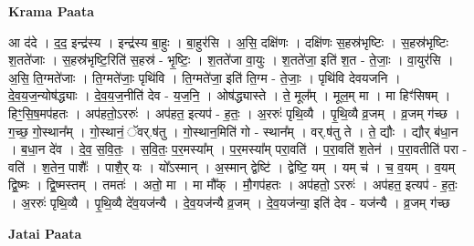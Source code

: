 \documentclass[17pt]{extarticle}
\begin{document}
\textbf{Krama Paata} \newline

आ द॑दे । द॒द॒ इन्द्र॑स्य । इन्द्र॑स्य बा॒हुः । बा॒हुर॑सि । अ॒सि॒ दक्षि॑णः । दक्षि॑णः स॒हस्र॑भृष्टिः । स॒हस्र॑भृष्टिः श॒तते॑जाः । स॒हस्र॑भृष्टि॒रिति॑ स॒हस्र॑ - भृ॒ष्टिः॒ । श॒तते॑जा वा॒युः । श॒तते॑जा॒ इति॑ श॒त - ते॒जाः॒ । वा॒युर॑सि । अ॒सि॒ ति॒ग्मते॑जाः । ति॒ग्मते॑जाः॒ पृथि॑वि । ति॒ग्मते॑जा॒ इति॑ ति॒ग्म - ते॒जाः॒ । पृथि॑वि देवयजनि । दे॒व॒य॒ज॒न्योष॑द्ध्याः । दे॒व॒य॒ज॒नीति॑ देव - य॒ज॒नि॒ । ओष॑द्ध्यास्ते । ते॒ मूल᳚म् । मूल॒म् मा । मा हिꣳ॑सिषम् । हिꣳ॒॒सि॒ष॒मप॑हतः । अप॑हतो॒ऽररुः॑ । अप॑हत॒ इत्यप॑ - ह॒तः॒ । अ॒ररुः॑ पृथि॒व्यै । पृ॒थि॒व्यै व्र॒जम् । व्र॒जम् ग॑च्छ । ग॒च्छ॒ गो॒स्थान᳚म् । गो॒स्थानं॒ ॅवर्.ष॑तु । गो॒स्थान॒मिति॑ गो - स्थान᳚म् । वर्.ष॑तु ते । ते॒ द्यौः । द्यौर् ब॑धा॒न । ब॒धा॒न दे॑व । दे॒व॒ स॒वि॒तः॒ । स॒वि॒तः॒ प॒र॒मस्या᳚म् । प॒र॒मस्या᳚म् परा॒वति॑ । प॒रा॒वति॑ श॒तेन॑ । प॒रा॒वतीति॑ परा - वति॑ । श॒तेन॒ पाशैः᳚ । पाशै॒र् यः । यो᳚ऽस्मान् । अ॒स्मान् द्वेष्टि॑ । द्वेष्टि॒ यम् । यम् च॑ । च॒ व॒यम् । व॒यम् द्वि॒ष्मः । द्वि॒ष्मस्तम् । तमतः॑ । अतो॒ मा । मा मौ᳚क् । मौ॒गप॑हतः । अप॑हतो॒ ऽररुः॑ । अप॑हत॒ इत्यप॑ - ह॒तः॒ । अ॒ररुः॑ पृथि॒व्यै । पृ॒थि॒व्यै दे॑व॒यज॑न्यै । दे॒व॒यज॑न्यै व्र॒जम् । दे॒व॒यज॑न्या॒ इति॑ देव - यज॑न्यै । व्र॒जम् ग॑च्छ \newline

\textbf{Jatai Paata} \newline
\end{document}
